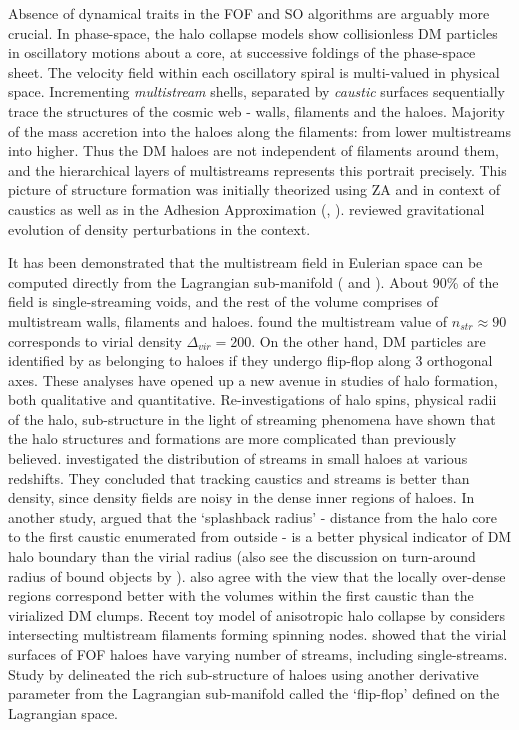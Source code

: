 Absence of dynamical traits in the FOF and SO algorithms are arguably more crucial. In phase-space, the halo collapse models show collisionless DM particles in oscillatory motions about a core, at successive foldings of the phase-space sheet. The velocity field within each oscillatory spiral is multi-valued in physical space. Incrementing {\it multistream} shells, separated by {\it caustic} surfaces sequentially trace the structures of the cosmic web - walls, filaments and the haloes. Majority of the mass accretion into the haloes along the filaments: from lower multistreams into higher. Thus the DM haloes are not independent of filaments around them, and the hierarchical layers of multistreams represents this portrait precisely. This picture of structure formation was initially theorized using ZA \cite{Zeldovich1970} and in context of caustics \cite{Arnold1982} as well as in the Adhesion Approximation (\citealt{Gurbatov1989}, \citealt{Kofman1992}). 
\cite{Shandarin1989} reviewed gravitational evolution of density perturbations in the context.  

It has been demonstrated that the multistream field in Eulerian space can be computed directly from the Lagrangian sub-manifold (\citealt{Shandarin2012} and \citealt{Abel2012}). About 90\% of the field is single-streaming voids, and the rest of the volume comprises of multistream walls, filaments and haloes. \cite{Ramachandra2015} found the multistream value of $n_{str} \approx 90$ corresponds to virial density $\Delta_{vir} = 200$. On the other hand, DM particles are identified by \citep{Falck2012} as belonging to haloes if they undergo flip-flop along 3 orthogonal axes. These analyses have opened up a new avenue in studies of halo formation, both qualitative and quantitative. Re-investigations of halo spins, physical radii of the halo, sub-structure in the light of streaming phenomena have shown that the halo structures and formations are more complicated than previously believed. \cite{Vogelsberger2011} investigated the distribution of streams in small haloes at various redshifts. They concluded that tracking caustics and streams is better than density, since density fields are noisy in the dense inner regions of haloes. In another study, \cite{More2015} argued that the `splashback radius' - distance from the halo core to the first caustic enumerated from outside - is a better physical indicator of DM halo boundary than the virial radius (also see the discussion on turn-around radius of bound objects by \citealt{Lee2016a}). \cite{Angulo2013a} also agree with the view that the locally over-dense regions correspond better with the volumes within the first caustic than the virialized DM clumps. Recent toy model of anisotropic halo collapse by \cite{Neyrinck2016} considers intersecting multistream filaments forming spinning nodes. \cite{Ramachandra2017} showed that the virial surfaces of FOF haloes have varying number of streams, including single-streams. Study by \cite{Shandarin2016} delineated the rich sub-structure of haloes using another derivative parameter from the Lagrangian sub-manifold called the `flip-flop' defined on the Lagrangian space. 


